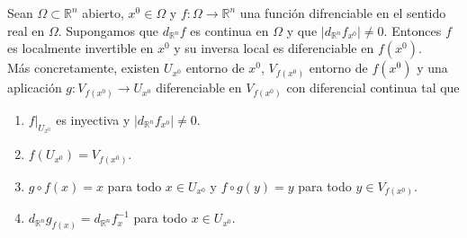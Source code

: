 \begin{teo}
Sean $\Omega \subset \mathbb{R}^n$ abierto, $x^0 \in \Omega$ y $f : \Omega \longrightarrow \mathbb{R}^n$ una función difrenciable en el sentido real en $\Omega$. Supongamos que $d_{\mathbb{R}^n}f$ es continua en $\Omega$ y que $|d_{\mathbb{R}^n}f_{x^0}| \not = 0$. Entonces $f$ es localmente invertible en $x^0$ y su inversa local es diferenciable en $f(x^0)$.
\\
\newline
Más concretamente, existen $U_{x^0}$ entorno de $x^0$, $V_{f(x^0)}$ entorno de $f(x^0)$ y una aplicación $g : V_{f(x^0)} \longrightarrow U_{x^0}$ diferenciable en $V_{f(x^0)}$ con diferencial continua tal que
\begin{enumerate}
    \item $f|_{U_{x^0}}$ es inyectiva y $|d_{\mathbb{R}^n}f_{x^0}| \not = 0$.
    \item $f(U_{x^0}) = V_{f(x^0)}$.
    \item $g \circ f (x) = x$ para todo $x \in U_{x^0}$ y $f \circ g (y) = y$ para todo $y \in V_{f(x^0)}$.
    \item $d_{\mathbb{R}^n}g_{f(x)} = d_{\mathbb{R}^n}f_{x}^{-1}$ para todo $x \in U_{x^0}$.
\end{enumerate}
\end{teo}

